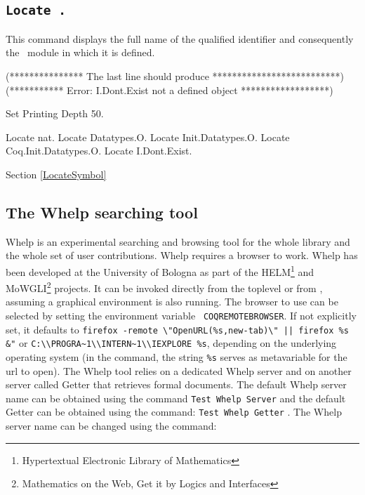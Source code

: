 
\subsection[\tt Locate {\qualid}.]{\tt Locate {\qualid}.
\label{Locate}}
This command displays the full name of the qualified identifier {\qualid}
and consequently the \Coq\ module in which it is defined.

\begin{coq_eval}
(*************** The last line should produce **************************)
(*********** Error: I.Dont.Exist not a defined object ******************)
\end{coq_eval}
\begin{coq_eval}
Set Printing Depth 50.
\end{coq_eval}
\begin{coq_example}
Locate nat.
Locate Datatypes.O.
Locate Init.Datatypes.O.
Locate Coq.Init.Datatypes.O.
Locate I.Dont.Exist.
\end{coq_example}

\SeeAlso Section \ref{LocateSymbol}

\subsection{The {\sc Whelp} searching tool
\label{Whelp}}

{\sc Whelp} is an experimental searching and browsing tool for the
whole {\Coq} library and the whole set of {\Coq} user contributions.
{\sc Whelp} requires a browser to work. {\sc Whelp} has been developed
at the University of Bologna as part of the HELM\footnote{Hypertextual
Electronic Library of Mathematics} and MoWGLI\footnote{Mathematics on
the Web, Get it by Logics and Interfaces} projects.  It can be invoked
directly from the {\Coq} toplevel or from {\CoqIDE}, assuming a
graphical environment is also running. The browser to use can be
selected by setting the environment variable {\tt
COQREMOTEBROWSER}. If not explicitly set, it defaults to
\verb!firefox -remote \"OpenURL(%s,new-tab)\" || firefox %s &"!  or
\verb!C:\\PROGRA~1\\INTERN~1\\IEXPLORE %s!, depending on the
underlying operating system (in the command, the string \verb!%s!
serves as metavariable for the url to open).
The Whelp tool relies on a dedicated Whelp server and on another server
called Getter that retrieves formal documents. The default Whelp server name
can be obtained using the command {\tt Test Whelp Server}
 and the default Getter can be obtained
using the command: {\tt Test Whelp Getter} . The Whelp server name can be changed using the command:

